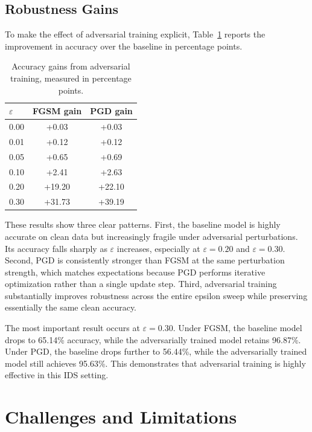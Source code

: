 \documentclass[11pt]{article}
\begin{document}
\subsection{Robustness Gains}

To make the effect of adversarial training explicit, Table~\ref{tab:gains} reports the improvement in accuracy over the baseline in percentage points.

\begin{table}[htbp]
\centering
\small
\begin{tabular}{lcc}
\toprule
$\varepsilon$ & FGSM gain & PGD gain \\
\midrule
0.00 & +0.03 & +0.03 \\
0.01 & +0.12 & +0.12 \\
0.05 & +0.65 & +0.69 \\
0.10 & +2.41 & +2.63 \\
0.20 & +19.20 & +22.10 \\
0.30 & +31.73 & +39.19 \\
\bottomrule
\end{tabular}
\caption{Accuracy gains from adversarial training, measured in percentage points.}
\label{tab:gains}
\end{table}

These results show three clear patterns. First, the baseline model is highly accurate on clean data but increasingly fragile under adversarial perturbations. Its accuracy falls sharply as $\varepsilon$ increases, especially at $\varepsilon = 0.20$ and $\varepsilon = 0.30$. Second, PGD is consistently stronger than FGSM at the same perturbation strength, which matches expectations because PGD performs iterative optimization rather than a single update step. Third, adversarial training substantially improves robustness across the entire epsilon sweep while preserving essentially the same clean accuracy.

The most important result occurs at $\varepsilon = 0.30$. Under FGSM, the baseline model drops to 65.14\% accuracy, while the adversarially trained model retains 96.87\%. Under PGD, the baseline drops further to 56.44\%, while the adversarially trained model still achieves 95.63\%. This demonstrates that adversarial training is highly effective in this IDS setting.

\section{Challenges and Limitations}
\end{document}
